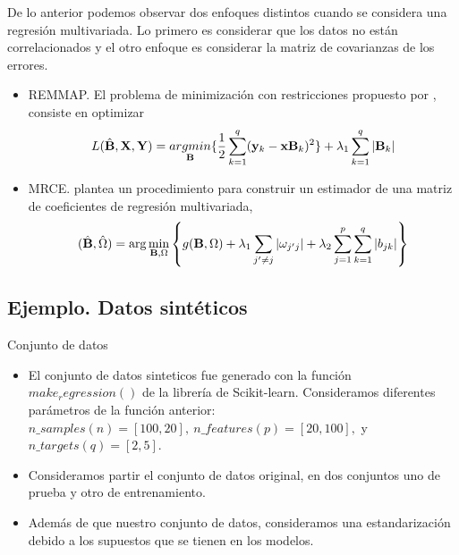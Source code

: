 \begin{frame}
De lo anterior podemos observar dos enfoques distintos cuando se considera una regresión multivariada. Lo primero es considerar que los datos no están correlacionados y el otro enfoque es considerar la matriz de covarianzas de los errores.
\begin{itemize}
    \item REMMAP. El problema de minimización con restricciones propuesto por \citep{remap}, consiste en optimizar
    $$ L(\hat{\mathbf{B}},\mathbf{X},\mathbf{Y})=  \underset{\mathbf{B}}{argmin} \{\frac{1}{2} \sum_{k=1}^{q} (\mathbf{y}_{k}-\mathbf{x} \mathbf{B}_{k})^{2} \} + \lambda_1 \sum_{k=1}^{q}|\mathbf{B}_{k}| $$
    
    \item MRCE. \cite{mrce} plantea un procedimiento para construir un estimador de una matriz de coeficientes de regresión multivariada,
    \begin{align}\label{log_verosimilitu_penalizado}
    (\hat{\mathbf{B}}, \hat{\Omega}) = \arg \min_{\mathbf{B}, \Omega} \left\{g(\mathbf{B}, \Omega)+\lambda_1\sum_{j'\neq j} |\omega_{j'j}| +\lambda_2\sum_{j=1}^p\sum_{k=1}^q|b_{jk}|\right\} 
\end{align}
\end{itemize}
\end{frame}
\subsection{Ejemplo. Datos sintéticos}
\begin{frame}{Conjunto de datos}
    \begin{itemize}[<+- | alert@+>]
    \item El conjunto de datos sinteticos fue generado con la función $make_regression()$ de la librería de Scikit-learn. Consideramos diferentes parámetros de la función anterior: $n\_samples (n)=[100,20],\  n\_features(p)=[20,100],$ y $ n\_targets(q)=[2,5]$.
    \item Consideramos partir el conjunto de datos original, en dos conjuntos uno de prueba y otro de entrenamiento.
    \item Además de que nuestro conjunto de datos, consideramos una estandarización debido a los supuestos que se tienen en los modelos.
    \end{itemize}
\end{frame}

